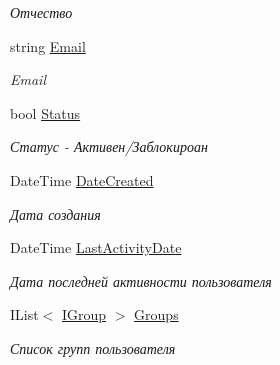 \begin{DoxyCompactItemize}
\begin{DoxyCompactList}\small\item\em Отчество \end{DoxyCompactList}\item 
string \hyperlink{interface_security_1_1_interfaces_1_1_model_1_1_i_user_a9a6f2fb3e7e83e60ff8a9439bb725073}{Email}
\begin{DoxyCompactList}\small\item\em Email \end{DoxyCompactList}\item 
bool \hyperlink{interface_security_1_1_interfaces_1_1_model_1_1_i_user_a99fb9e2ac085935c059236b48fe16b07}{Status}
\begin{DoxyCompactList}\small\item\em Статус -\/ Активен/Заблокироан \end{DoxyCompactList}\item 
Date\+Time \hyperlink{interface_security_1_1_interfaces_1_1_model_1_1_i_user_a3ca8c320f0de1faad409db46f13b9cea}{Date\+Created}
\begin{DoxyCompactList}\small\item\em Дата создания \end{DoxyCompactList}\item 
Date\+Time \hyperlink{interface_security_1_1_interfaces_1_1_model_1_1_i_user_af0ddd8cff908125d9caebd957b42632f}{Last\+Activity\+Date}
\begin{DoxyCompactList}\small\item\em Дата последней активности пользователя \end{DoxyCompactList}\item 
I\+List$<$ \hyperlink{interface_security_1_1_interfaces_1_1_model_1_1_i_group}{I\+Group} $>$ \hyperlink{interface_security_1_1_interfaces_1_1_model_1_1_i_user_a36fe632680ded041c27e2c01b454abf7}{Groups}
\begin{DoxyCompactList}\small\item\em Список групп пользователя \end{DoxyCompactList}\end{DoxyCompactItemize}


